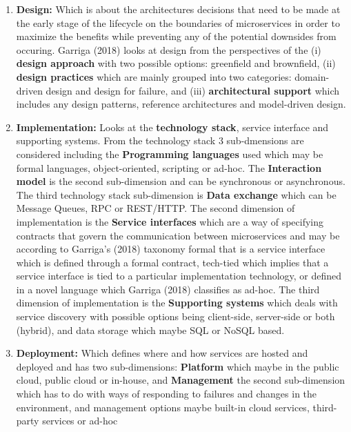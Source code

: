 \documentclass{article}
\begin{document}
\begin{multicols}{2}
\begin{enumerate}

\item \textbf{Design:} 
Which is about the architectures decisions that need to be made at the early stage of the lifecycle on the boundaries of microservices in order to maximize the benefits while preventing any of the potential downsides from occuring. Garriga (2018) looks at design from the perspectives of the (i) \textbf{design approach} with two possible options: greenfield and brownfield, (ii) \textbf{design practices} which are mainly grouped into two categories: domain-driven design and design for failure, and (iii) \textbf{architectural support} which includes any design patterns, reference architectures and model-driven design.

\item \textbf{Implementation:} 
Looks at the \textbf{technology stack}, service interface and supporting systems. From the technology stack 3 sub-dmensions are considered including the \textbf{Programming languages} used which may be formal languages, object-oriented, scripting or ad-hoc. The \textbf{Interaction model} is the second sub-dimension and can be synchronous or asynchronous. The third technology stack sub-dimension is \textbf{Data exchange} which can be Message Queues, RPC or REST/HTTP. The second dimension of implementation is the \textbf{Service interfaces} which are a way of specifying contracts that govern the communication between microservices and may be according to Garriga's (2018) taxonomy formal that is a service interface which is defined through a formal contract, tech-tied which implies that a service interface is tied to a particular implementation technology, or defined in a novel language which Garriga (2018) classifies as ad-hoc. The third dimension of implementation is the \textbf{Supporting systems} which deals with service discovery with possible options being client-side, server-side or both (hybrid), and data storage which maybe SQL or NoSQL based.

\item \textbf{Deployment:} 
Which defines where and how services are hosted and deployed and has two sub-dimensions: \textbf{Platform} which maybe in the public cloud, public cloud or in-house, and \textbf{Management} the second sub-dimension which has to do with ways of responding to failures and changes in the environment, and management options maybe built-in cloud services, third-party services or ad-hoc


\end{enumerate}
\end{multicols}
\end{document}
